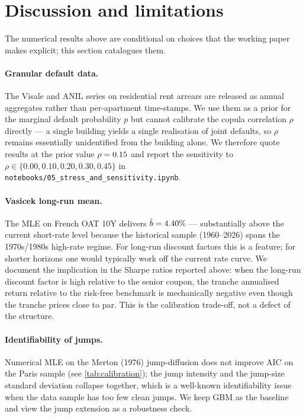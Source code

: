 \section{Discussion and limitations}\label{sec:discussion}

The numerical results above are conditional on choices that the working
paper makes explicit; this section catalogues them.

\paragraph{Granular default data.}
The Visale and ANIL series on residential rent arrears are released as
annual aggregates rather than per-apartment time-stamps. We use them as a
prior for the marginal default probability $p$ but cannot calibrate the
copula correlation $\rho$ directly --- a single building yields a single
realisation of joint defaults, so $\rho$ remains essentially unidentified
from the building alone. We therefore quote results at the prior value
$\rho = 0.15{}$ and report the sensitivity to
$\rho \in \{0.00, 0.10, 0.20, 0.30, 0.45\}$ in
\texttt{notebooks/05\_stress\_and\_sensitivity.ipynb}.

\paragraph{Vasicek long-run mean.}
The MLE on French OAT 10Y delivers $\hat b = 4.40\%{}$ ---
substantially above the current short-rate level because the historical
sample (1960--2026) spans the 1970s/1980s high-rate regime. For long-run
discount factors this is a feature; for shorter horizons one would
typically work off the current rate curve. We document the implication in
the Sharpe ratios reported above: when the long-run discount factor is
high relative to the senior coupon, the tranche annualised return relative
to the risk-free benchmark is mechanically negative even though the
tranche prices close to par. This is the calibration trade-off, not a
defect of the structure.

\paragraph{Identifiability of jumps.}
Numerical MLE on the Merton (1976) jump-diffusion does not improve AIC on
the Paris sample (see \cref{tab:calibration}); the jump intensity and the
jump-size standard deviation collapse together, which is a well-known
identifiability issue when the data sample has too few clean jumps. We
keep GBM as the baseline and view the jump extension as a robustness
check.

